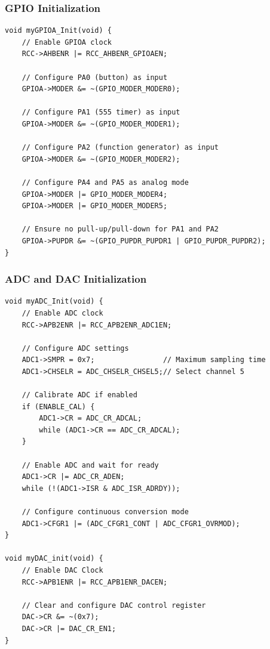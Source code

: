 \subsubsection{GPIO Initialization}
\begin{lstlisting}[caption=GPIO Port A Initialization Function]
void myGPIOA_Init(void) {
    // Enable GPIOA clock
    RCC->AHBENR |= RCC_AHBENR_GPIOAEN;
    
    // Configure PA0 (button) as input
    GPIOA->MODER &= ~(GPIO_MODER_MODER0);
    
    // Configure PA1 (555 timer) as input
    GPIOA->MODER &= ~(GPIO_MODER_MODER1);
    
    // Configure PA2 (function generator) as input
    GPIOA->MODER &= ~(GPIO_MODER_MODER2);
    
    // Configure PA4 and PA5 as analog mode
    GPIOA->MODER |= GPIO_MODER_MODER4;
    GPIOA->MODER |= GPIO_MODER_MODER5;
    
    // Ensure no pull-up/pull-down for PA1 and PA2
    GPIOA->PUPDR &= ~(GPIO_PUPDR_PUPDR1 | GPIO_PUPDR_PUPDR2);
}
\end{lstlisting}

\subsubsection{ADC and DAC Initialization}
\begin{lstlisting}[caption=ADC Initialization Function]
void myADC_Init(void) {
    // Enable ADC clock
    RCC->APB2ENR |= RCC_APB2ENR_ADC1EN;
    
    // Configure ADC settings
    ADC1->SMPR = 0x7;                // Maximum sampling time
    ADC1->CHSELR = ADC_CHSELR_CHSEL5;// Select channel 5
    
    // Calibrate ADC if enabled
    if (ENABLE_CAL) {
        ADC1->CR = ADC_CR_ADCAL;
        while (ADC1->CR == ADC_CR_ADCAL);
    }
    
    // Enable ADC and wait for ready
    ADC1->CR |= ADC_CR_ADEN;
    while (!(ADC1->ISR & ADC_ISR_ADRDY));
    
    // Configure continuous conversion mode
    ADC1->CFGR1 |= (ADC_CFGR1_CONT | ADC_CFGR1_OVRMOD);
}

void myDAC_init(void) {
    // Enable DAC Clock
    RCC->APB1ENR |= RCC_APB1ENR_DACEN;
    
    // Clear and configure DAC control register
    DAC->CR &= ~(0x7);
    DAC->CR |= DAC_CR_EN1;
}
\end{lstlisting}

